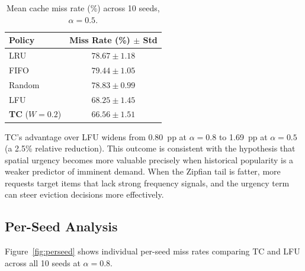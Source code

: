 \documentclass[preprint,12pt]{elsarticle}
\begin{document}
	\begin{table}[t]
		\centering
		\renewcommand{\arraystretch}{1.1}
		\caption{Mean cache miss rate (\%) across 10 seeds, $\alpha = 0.5$.}
		\label{tab:skew}
		\begin{tabular}{lc}
			\toprule
			\textbf{Policy} & \textbf{Miss Rate (\%) $\pm$ Std} \\
			\midrule
			LRU & $78.67 \pm 1.18$ \\
			FIFO & $79.44 \pm 1.05$ \\
			Random & $78.83 \pm 0.99$ \\
			LFU & $68.25 \pm 1.45$ \\
			\textbf{TC} ($W=0.2$) & $\mathbf{66.56 \pm 1.51}$ \\
			\bottomrule
		\end{tabular}
	\end{table}
	
	TC's advantage over LFU widens from 0.80~pp at $\alpha = 0.8$ to 1.69~pp at $\alpha = 0.5$ (a 2.5\% relative reduction). This outcome is consistent with the hypothesis that spatial urgency becomes more valuable precisely when historical popularity is a weaker predictor of imminent demand. When the Zipfian tail is fatter, more requests target items that lack strong frequency signals, and the urgency term can steer eviction decisions more effectively.
	
	\subsection{Per-Seed Analysis}
	\label{sec:seed}
	
	Figure~\ref{fig:perseed} shows individual per-seed miss rates comparing TC and LFU across all 10 seeds at $\alpha = 0.8$.
	
\end{document}
